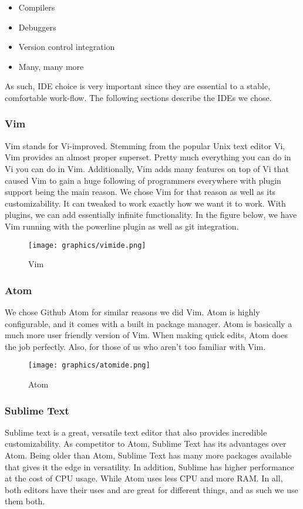 \documentclass[letterpaper, 12pt]{article}
\begin{document}
\begin{itemize}
	\item Compilers
	\item Debuggers
	\item Version control integration
	\item Many, many more
\end{itemize}

As such, IDE choice is very important since they are essential to a stable, comfortable 
work-flow. The following sections describe the IDEs we chose.

\subsubsection{Vim}

Vim stands for Vi-improved. Stemming from the popular Unix text editor Vi, Vim 
provides an almost proper superset. Pretty much everything you can do in Vi you 
can do in Vim. Additionally, Vim adds many features on top of Vi that caused Vim 
to gain a huge following of programmers everywhere with plugin support being the main 
reason. We chose Vim for that reason as well as its customizability. It can tweaked 
to work exactly how we want it to work. With plugins, we can add essentially infinite 
functionality. In the figure below, we have Vim running with the powerline plugin as 
well as git integration. 

\begin{figure}
    \centering
	\texttt{[image: graphics/vimide.png]}
    \caption{Vim}
\end{figure}

\newpage

\subsubsection{Atom}
We chose Github Atom for similar reasons we did Vim. Atom is highly configurable, and it 
comes with a built in package manager. Atom is basically a much more user friendly 
version of Vim. When making quick edits, Atom does the job perfectly. Also, for 
those of us who aren't too familiar with Vim. 
\begin{figure}
    \centering
	\texttt{[image: graphics/atomide.png]}
    \caption{Atom}
\end{figure}

\newpage

\subsubsection{Sublime Text}
Sublime text is a great, versatile text editor that also provides incredible customizability. 
As competitor to Atom, Sublime Text has its advantages over Atom. Being older than Atom, 
Sublime Text has many more packages available that gives it the edge in versatility. In 
addition, Sublime has higher performance at the cost of CPU usage. While Atom uses less 
CPU and more RAM. In all, both editors have their uses and are great for different things, 
and as such we use them both. 
\end{document}
